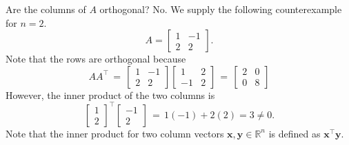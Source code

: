 \documentclass{beamer}
\def\x{\bm{x}}
\def\y{\bm{y}}
\begin{document}
        \begin{frame}{Are the columns of $A$ orthogonal?}
                No. We supply the following counterexample for $n = 2$.
                \[
                        A = \begin{bmatrix}
                                1 & -1 \\ 2 & 2
                        \end{bmatrix}.
                \]
                Note that the rows are orthogonal because 
                \[
                        A A^\top \,=\, \begin{bmatrix}
                                1 & -1 \\ 2 & 2
                        \end{bmatrix}
                        \begin{bmatrix}
                                1 & 2 \\ -1 & 2
                        \end{bmatrix}
                        \,=\, \begin{bmatrix}
                                2 & 0 \\ 0 & 8
                        \end{bmatrix}
                \]
                \pause
                However, the inner product of the two columns is
                \[
                        \begin{bmatrix}
                                1 \\ 2
                        \end{bmatrix}^\top
                        \begin{bmatrix}
                                -1 \\ 2
                        \end{bmatrix}
                        \,=\, 1(-1) + 2(2) = 3 \neq 0.
                \]
                Note that the inner product for two column vectors $\x, \y \in \mathbb{R}^n$ is defined as $\x^\top\y$.
        \end{frame}
\end{document}
